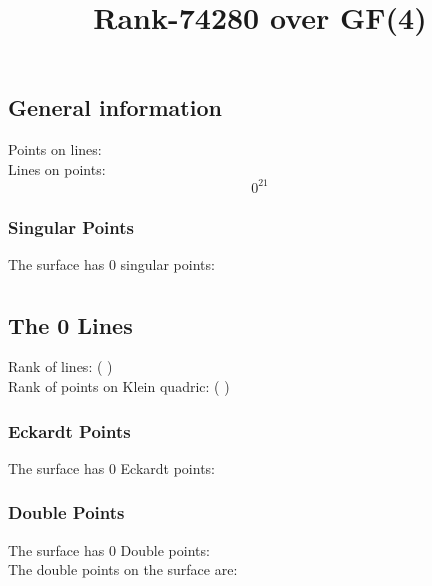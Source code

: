 \documentclass{article}
\newcommand\setTBstruts{\def\T{\rule{0pt}{2.6ex}}%
\def\B{\rule[-1.2ex]{0pt}{0pt}}}
\begin{document}
 
\setTBstruts



{\allowdisplaybreaks%






\title{Rank-74280 over GF(4)}
\author{}%
\maketitle%
%
{}



\subsection*{General information}
Points on lines:
$$
$$
Lines on points:
$$
0^{21}$$
\subsubsection*{Singular Points}
The surface has 0 singular points:\\
\begin{align*}
\end{align*}
\subsection*{The 0 Lines}
Rank of lines: (  )\\
Rank of points on Klein quadric: (  )\\
\subsubsection*{Eckardt Points}
The surface has 0 Eckardt points:\\
\subsubsection*{Double Points}
The surface has 0 Double points:\\
The double points on the surface are:\\
\begin{multicols}{2}
\noindent
\end{multicols}
}
\end{document}
